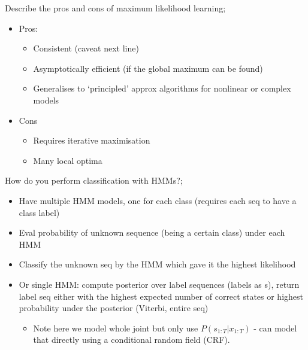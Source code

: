 \documentclass{article}
\begin{document}
Describe the pros and cons of maximum likelihood learning; \begin{itemize} \item Pros: \begin{itemize} \item Consistent (caveat next line) \item Asymptotically efficient (if the global maximum can be found) \item Generalises to `principled' approx algorithms for nonlinear or complex models  \end{itemize} \item Cons \begin{itemize} \item Requires iterative maximisation \item Many local optima \end{itemize} \end{itemize}

How do you perform classification with HMMs?; \begin{itemize} \item Have multiple HMM models, one for each class (requires each seq to have a class label) \item Eval probability of unknown sequence (being a certain class) under each HMM \item Classify the unknown seq by the HMM which gave it the highest likelihood \item Or single HMM: compute posterior over label sequences (labels as s), return label seq either with the highest expected number of correct states or highest probability under the posterior (Viterbi, entire seq) \begin{itemize} \item Note here we model whole joint but only use $P(s_{1:T}|x_{1:T})$ - can model that directly using a conditional random field (CRF). \end{itemize} \end{itemize}

\end{document}
